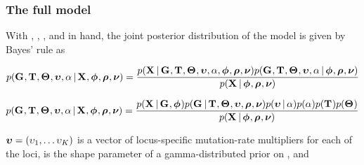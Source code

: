 \begin{frame}[t]
    \frametitle{The full model}
    With \alignmentVector, \hkyModelVector, \ploidyScalarVector, and
    \mutationRateScalarConstantVector in hand, the joint posterior distribution
    of the model is given by Bayes' rule as
    \smallskip

    \begin{displaybox}
        \footnotesize
        \[
            p(\geneTreeVector, \divTimeMapVector, \demographicParamVector, 
            \locusMutationRateScalarVector, \locusRateHetShapeParameter \given
            \alignmentVector, \hkyModelVector, \ploidyScalarVector,
            \mutationRateScalarConstantVector) =
            \frac{p(\alignmentVector \given \geneTreeVector, \divTimeMapVector,
                \demographicParamVector, \locusMutationRateScalarVector,
                \locusRateHetShapeParameter, \hkyModelVector, \ploidyScalarVector,
                \mutationRateScalarConstantVector)
                p(\geneTreeVector, \divTimeMapVector, \demographicParamVector,
                \locusMutationRateScalarVector, \locusRateHetShapeParameter \given
                \hkyModelVector, \ploidyScalarVector,
                \mutationRateScalarConstantVector)}{
                p(\alignmentVector \given \hkyModelVector, \ploidyScalarVector,
                \mutationRateScalarConstantVector)}
        \]\vspace{0mm}
    \end{displaybox}
    \smallskip

    \begin{displaybox}
        \footnotesize
        \[
            p(\geneTreeVector, \divTimeMapVector, \demographicParamVector, 
            \locusMutationRateScalarVector, \locusRateHetShapeParameter \given
            \alignmentVector, \hkyModelVector, \ploidyScalarVector,
            \mutationRateScalarConstantVector) =
            \frac{p(\alignmentVector \given \geneTreeVector, \hkyModelVector)
                p(\geneTreeVector \given \divTimeMapVector, \demographicParamVector,
                \locusMutationRateScalarVector, \ploidyScalarVector,
                \mutationRateScalarConstantVector)
                p(\locusMutationRateScalarVector \given \locusRateHetShapeParameter)
                p(\locusRateHetShapeParameter)
                p(\divTimeMapVector)
                p(\demographicParamVector)}{
                p(\alignmentVector \given \hkyModelVector, \ploidyScalarVector,
                \mutationRateScalarConstantVector)}
        \]\vspace{0mm}
    \end{displaybox}
    \smallskip

$\boldsymbol{\upsilon} = (\upsilon_{1}, \ldots
\upsilon_{K})$
is a vector of locus-specific mutation-rate multipliers for each of the
\nlociTotal loci,
\locusRateHetShapeParameter is the shape parameter of a gamma-distributed
prior on \locusMutationRateScalar{}, and
\end{frame}

